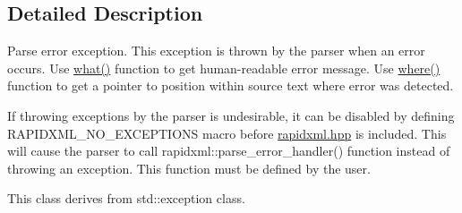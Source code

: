\subsection{Detailed Description}
Parse error exception. This exception is thrown by the parser when an error occurs. Use \hyperlink{classrapidxml_1_1parse__error_a7665c88639e7466ee1de388a4f85e6fe}{what()} function to get human-\/readable error message. Use \hyperlink{classrapidxml_1_1parse__error_a3a0ab9e586c1d2b437c340f6622fbec6}{where()} function to get a pointer to position within source text where error was detected. \par
\par
 If throwing exceptions by the parser is undesirable, it can be disabled by defining R\-A\-P\-I\-D\-X\-M\-L\-\_\-\-N\-O\-\_\-\-E\-X\-C\-E\-P\-T\-I\-O\-N\-S macro before \hyperlink{rapidxml_8hpp}{rapidxml.\-hpp} is included. This will cause the parser to call rapidxml\-::parse\-\_\-error\-\_\-handler() function instead of throwing an exception. This function must be defined by the user. \par
\par
 This class derives from {\ttfamily std\-::exception} class. 

